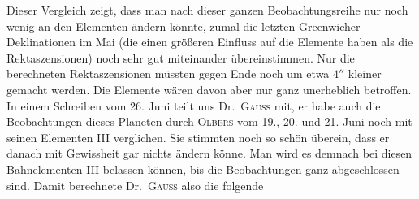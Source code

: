 Dieser Vergleich zeigt, dass man nach dieser ganzen Beobachtungsreihe nur noch wenig an den Elementen ändern könnte, zumal die letzten Greenwicher Deklinationen im Mai (die einen größeren Einfluss auf die Elemente haben als die Rektaszensionen) noch sehr gut miteinander übereinstimmen. Nur die berechneten Rektaszensionen müssten gegen Ende noch um etwa $4''$ kleiner gemacht werden. Die Elemente wären davon aber nur ganz unerheblich betroffen. In einem Schreiben vom 26. Juni teilt uns Dr.\ \textsc{Gauß} mit, er habe auch die Beobachtungen dieses Planeten durch \textsc{Olbers} vom 19., 20. und 21. Juni noch mit seinen Elementen III verglichen. Sie stimmten noch so schön überein, dass er danach mit Gewissheit gar nichts ändern könne. Man wird es demnach bei diesen Bahnelementen III belassen können, bis die Beobachtungen ganz abgeschlossen sind. Damit berechnete Dr.\ \textsc{Gauß} also die folgende

